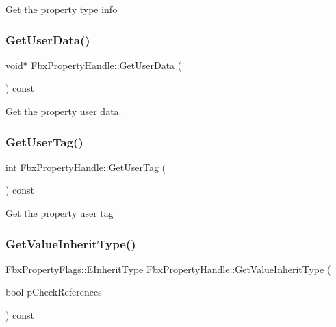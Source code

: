 Get the property type info 

\mbox{\label{class_fbx_property_handle_a6e6c699c0fc80977bb746198e41708cd}} 
\subsubsection{\texorpdfstring{Get\+User\+Data()}{GetUserData()}}
{\footnotesize\ttfamily void$\ast$ Fbx\+Property\+Handle\+::\+Get\+User\+Data (\begin{DoxyParamCaption}{ }\end{DoxyParamCaption}) const}



Get the property user data. 

\mbox{\label{class_fbx_property_handle_a9ce046fde2818e1e90782fea7b3294c9}} 
\subsubsection{\texorpdfstring{Get\+User\+Tag()}{GetUserTag()}}
{\footnotesize\ttfamily int Fbx\+Property\+Handle\+::\+Get\+User\+Tag (\begin{DoxyParamCaption}{ }\end{DoxyParamCaption}) const}



Get the property user tag 

\mbox{\label{class_fbx_property_handle_a899c4594086890878626f4755da6c690}} 
\subsubsection{\texorpdfstring{Get\+Value\+Inherit\+Type()}{GetValueInheritType()}}
{\footnotesize\ttfamily \hyperlink{class_fbx_property_flags_ae3b667a4fcac4b827fa186a698fec2f8}{Fbx\+Property\+Flags\+::\+E\+Inherit\+Type} Fbx\+Property\+Handle\+::\+Get\+Value\+Inherit\+Type (\begin{DoxyParamCaption}\item[{bool}]{p\+Check\+References }\end{DoxyParamCaption}) const}

